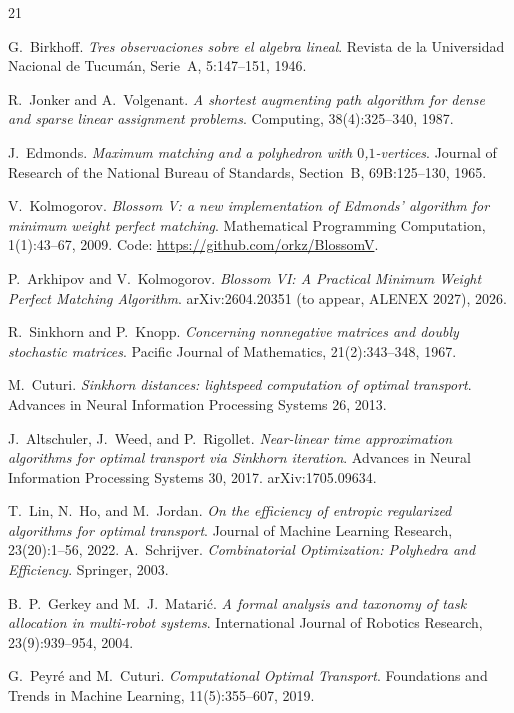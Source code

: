 \documentclass[11pt]{article}
\theoremstyle{remark}
\begin{document}
\begin{thebibliography}{21}

G.~Birkhoff. \emph{Tres observaciones sobre el algebra lineal}.
Revista de la Universidad Nacional de Tucum\'an, Serie~A, 5:147--151, 1946.

R.~Jonker and A.~Volgenant. \emph{A shortest augmenting path algorithm for
dense and sparse linear assignment problems}. Computing, 38(4):325--340,
1987.

J.~Edmonds. \emph{Maximum matching and a polyhedron with $0$,$1$-vertices}.
Journal of Research of the National Bureau of Standards, Section~B,
69B:125--130, 1965.

V.~Kolmogorov. \emph{Blossom V: a new implementation of Edmonds' algorithm
for minimum weight perfect matching}. Mathematical Programming Computation,
1(1):43--67, 2009. Code: \url{https://github.com/orkz/BlossomV}.

P.~Arkhipov and V.~Kolmogorov. \emph{Blossom VI: A Practical Minimum Weight
Perfect Matching Algorithm}. arXiv:2604.20351 (to appear, ALENEX 2027),
2026.

R.~Sinkhorn and P.~Knopp. \emph{Concerning nonnegative matrices and doubly
stochastic matrices}. Pacific Journal of Mathematics, 21(2):343--348, 1967.

M.~Cuturi. \emph{Sinkhorn distances: lightspeed computation of optimal
transport}. Advances in Neural Information Processing Systems 26, 2013.

J.~Altschuler, J.~Weed, and P.~Rigollet. \emph{Near-linear time approximation
algorithms for optimal transport via Sinkhorn iteration}. Advances in
Neural Information Processing Systems 30, 2017. arXiv:1705.09634.

T.~Lin, N.~Ho, and M.~Jordan. \emph{On the efficiency of entropic
regularized algorithms for optimal transport}. Journal of Machine Learning
Research, 23(20):1--56, 2022.
A.~Schrijver. \emph{Combinatorial Optimization: Polyhedra and Efficiency}.
Springer, 2003.

B.~P.~Gerkey and M.~J.~Matari\'c. \emph{A formal analysis and taxonomy of
task allocation in multi-robot systems}. International Journal of Robotics
Research, 23(9):939--954, 2004.

G.~Peyr\'e and M.~Cuturi. \emph{Computational Optimal Transport}.
Foundations and Trends in Machine Learning, 11(5):355--607, 2019.


\end{thebibliography}
\end{document}
